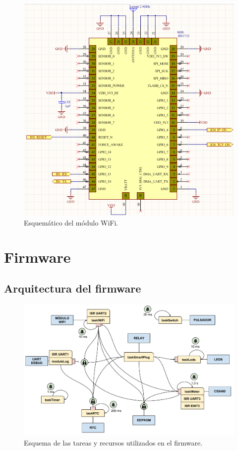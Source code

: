 \begin{figure}[h]
	\centering
	\includegraphics[width=12cm]{./Figures/3_1_2_pcb_wifi.png}
	\caption{Esquemático del módulo WiFi.}
	\label{fig:pcb_wifi}
\end{figure}


\section{Firmware}

\subsection{Arquitectura del firmware}

\begin{figure}[h]
	\centering
	\includegraphics[width=16cm]{./Figures/3_2_1_firmware_esquema_tareas.pdf}
	\caption{Esquema de las tareas y recursos utilizados en el firmware.}
	\label{fig:firmware_esquema_tareas}
\end{figure}


